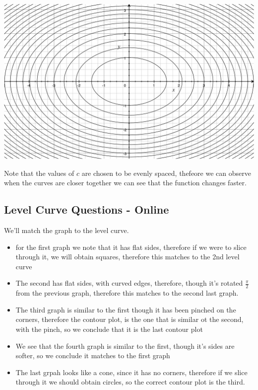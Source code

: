 \documentclass[11pt]{book}
\begin{document}
\begin{center}
    \includegraphics[width=0.7\columnwidth]{assets/level-c.jpg} 
\end{center}

Note that the values of $c$ are chosen to be evenly spaced, thefeore we can observe when the curves are closer together we can see that the function changes faster.

\subsection{Level Curve Questions - Online}%
\label{sub:level_curve_questions_online}
We'll match the graph to the level curve.
\begin{itemize}
    \item for the first graph we note that it has flat sides, therefore if we were to slice through it, we will obtain squares, therefore this matches to the 2nd level curve
    \item The second has flat sides, with curved edges, therefore, though it's rotated $\frac{\pi}{2} $ from the previous graph, therefore this matches to the second last graph.
    \item The third graph is similar to the first though it has been pinched on the corners, therefore the contour plot, is the one that is similar ot the second, with the pinch, so we conclude that it is the last contour plot
    \item We see that the fourth graph is similar to the first, though it's sides are softer, so we conclude it matches to the first graph
    \item The last grpah looks like a cone, since it has no corners, therefore if we slice through it we should obtain circles, so the correct contour plot is the third.
\end{itemize}

\newpage
\end{document}
